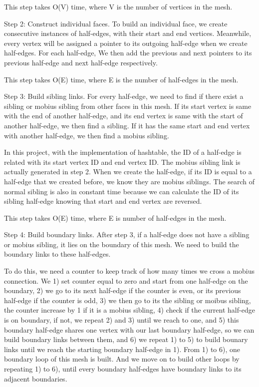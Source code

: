 \documentclass[12pt]{article}
\begin{document}
This step takes O(V) time, where V is the number of vertices in the mesh.

Step 2: Construct individual faces. To build an individual face, we create consecutive instances of half-edges, with their start and end vertices. Meanwhile, every vertex will be assigned a pointer to its outgoing half-edge when we create half-edges. For each half-edge, We then add the previous and next pointers to its previous half-edge and next half-edge respectively. 

This step takes O(E) time, where E is the number of half-edges in the mesh.

Step 3: Build sibling links. For every half-edge, we need to find if there exist a sibling or mobius sibling from other faces in this mesh. If its start vertex is same with the end of another half-edge, and its end vertex is same with the start of another half-edge, we then find a sibling. If it has the same start and end vertex with another half-edge, we then find a mobius sibling. 

In this project, with the implementation of hashtable, the ID of a half-edge is related with its start vertex ID and end vertex ID. The mobius sibling link is actually generated in step 2. When we create the half-edge, if its ID is equal to a half-edge that we created before, we know they are mobius siblings. The search of normal sibling is also in constant time because we can calculate the ID of its sibling half-edge knowing that start and end vertex are reversed. 

This step takes O(E) time, where E is number of half-edges in the mesh.

Step 4: Build boundary links. After step 3, if a half-edge does not have a sibling or mobius sibling, it lies on the boundary of this mesh. We need to build the boundary links to these half-edges.

To do this, we need a counter to keep track of how many times we cross a mobius connection. We 1) set counter equal to zero and start from one half-edge on the boundary, 2) we go to its next half-edge if the counter is even, or its previous half-edge if the counter is odd, 3) we then go to its the sibling or moibus sibling, the counter increase by 1 if it is a mobius sibling, 4) check if the current half-edge is on boundary, if not, we repeat 2) and 3) until we reach to one, and 5) this boundary half-edge shares one vertex with our last boundary half-edge, so we can build boundary links between them, and 6) we repeat 1) to 5) to build bounary links until we reach the starting boundary half-edge in 1). From 1) to 6), one boundary loop of this mesh is built. And we move on to build other loops by repeating 1) to 6), until every boundary half-edges have boundary links to its adjacent boundaries.
\end{document}
